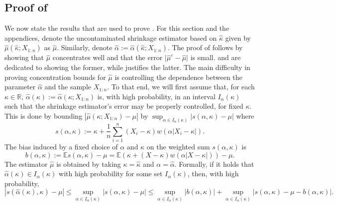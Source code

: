 \documentclass{article}
\theoremstyle{plain}
\theoremstyle{definition}
\def\R{\mathbb{R}} %
\def\eps{\varepsilon}
\newcommand{\E}{\mathbb{E}} %
\begin{document}
\subsection{Proof of } \label{sec:proof_of_theorem_3_1}
We now state the results that are used to prove . 
For this section and the appendices, denote the uncontaminated shrinkage estimator based on \( \widehat{\kappa }   \) given by \( \widehat{\mu}(\widehat{\kappa } ; X_{1:n} )  \) as \( \widehat{\mu }  \). Similarly, denote \(\widehat{\alpha}:=\widehat{\alpha}(\widehat{\kappa};X_{1:n})\). The proof of  follows by showing that \( \widehat{\mu }  \) concentrates well and that the error \( \lvert \widehat{\mu}^\eps  - \widehat{\mu}   \rvert  \) is small.  and  are dedicated to showing the former, while  justifies the latter. The main difficulty in proving concentration bounds for \( \widehat{\mu}  \)  is controlling the dependence between the parameter \( \widehat{\alpha}  \) and the sample \( X_{1:n} \).
To that end, we will first assume that, for each \( \kappa \in \R \), \( \widehat{\alpha }(\kappa ):= \widehat{\alpha}(\kappa;X_{1:n})\) is, with high probability, in an interval \( I_\alpha(\kappa ) \) such that the shrinkage estimator's error may be properly controlled, for fixed \( \kappa  \). This is done by bounding $|\widehat{\mu}(\kappa;X_{1:n}) - \mu|$ by $ \sup_{\alpha\in I_\alpha (\kappa )} |s(\alpha,\kappa ) - \mu|$ where
\[
	s(\alpha,\kappa ):=\kappa+\frac{1}{n}\sum_{i=1}^n(X_i-\kappa)w(\alpha|X_i-\kappa|).
\]
The bias induced by a fixed choice of $\alpha$ and $\kappa$ on the weighted sum $s(\alpha,\kappa)$ is
\[ b(\alpha,\kappa) := \E s(\alpha,\kappa) - \mu = \E\left( \kappa + (X-\kappa)w(\alpha |X-\kappa|) \right) - \mu. \]
The estimator \( \widehat{\mu }  \) is obtained by taking $\kappa = \widehat{\kappa}$ and $\alpha = \widehat{\alpha}$. Formally, if it holds that $\widehat{\alpha}(\kappa ) \in I_\alpha(\kappa) $ with high probability for some set $I_\alpha (\kappa )$, then, with high probability, 
\begin{equation}
	\label{eq:basic_biasvariance}
  |s(\widehat{\alpha}(\kappa ), \kappa ) - \mu| \leq \sup_{\alpha \in I_\alpha (\kappa )} |s(\alpha,\kappa ) - \mu| \leq \sup_{\alpha \in I_\alpha (\kappa )} |b(\alpha,\kappa )| + \sup_{\alpha \in I_\alpha (\kappa )} |s(\alpha,\kappa ) - \mu - b(\alpha,\kappa )|.
\end{equation}
\end{document}
